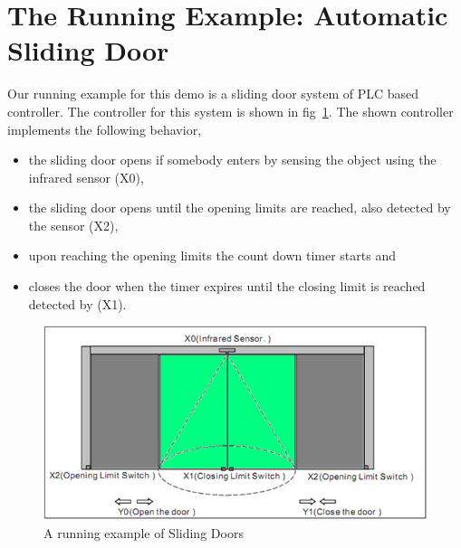 \section{The Running Example: Automatic Sliding Door}
\label{sec:example}
Our running example for this demo is a sliding door system of PLC based
controller. The controller for this system is shown in fig~\ref{fig:sliding_doors_example}. The shown controller implements the
following behavior,
\begin{itemize}
  \item the sliding door opens if somebody enters by sensing the object using
  the infrared sensor (X0),
  \item the sliding door opens until the opening limits are reached, also
  detected by the sensor (X2),
  \item upon reaching the opening limits the count down timer starts and
  \item closes the door when the timer expires until the closing limit is
  reached detected by (X1).
\end{itemize}
\begin{figure}[!h]
\centering
\includegraphics[width=1\textwidth]{./images/SlidingDoors.png}
\caption{A running example of Sliding Doors}
\label{fig:sliding_doors_example}
\end{figure}
